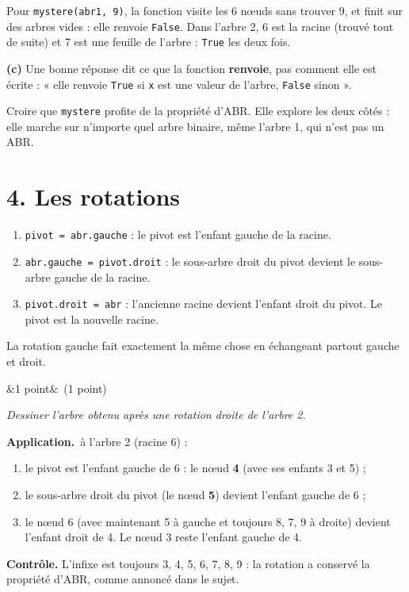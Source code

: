 \documentclass[11pt, a4paper]{exam}
\newcommand{\code}[1]{\texttt{#1}}
\newcommand{\Q}[3]{\par\needspace{5\baselineskip}\bigskip\noindent{\large\bfseries Question #1}\ifx&#2&\else\ \textnormal{(#2)}\fi\par\nopagebreak\smallskip\noindent\textit{#3}\par\nopagebreak\smallskip}
\newcommand{\application}{\par\noindent\textbf{Application.}\ }
\begin{document}
Pour \code{mystere(abr1, 9)}, la fonction visite les 6 nœuds sans trouver 9, et finit sur des arbres vides : elle renvoie \code{False}. Dans l'arbre 2, 6 est la racine (trouvé tout de suite) et 7 est une feuille de l'arbre : \code{True} les deux fois.

\textbf{(c)} Une bonne réponse dit ce que la fonction \textbf{renvoie}, pas comment elle est écrite : « elle renvoie \code{True} si \code{x} est une valeur de l'arbre, \code{False} sinon ».
\begin{erreur}
Croire que \code{mystere} profite de la propriété d'ABR. Elle explore les deux côtés : elle marche sur n'importe quel arbre binaire, même l'arbre 1, qui n'est pas un ABR.
\end{erreur}

\section*{4. Les rotations}

\begin{retenir}
\begin{enumerate}
\item \code{pivot = abr.gauche} : le pivot est l'enfant gauche de la racine.
\item \code{abr.gauche = pivot.droit} : le sous-arbre droit du pivot devient le sous-arbre gauche de la racine.
\item \code{pivot.droit = abr} : l'ancienne racine devient l'enfant droit du pivot. Le pivot est la nouvelle racine.
\end{enumerate}
La rotation gauche fait exactement la même chose en échangeant partout gauche et droit.
\end{retenir}

\Q{8}{1 point}{Dessiner l'arbre obtenu après une rotation droite de l'arbre 2.}
\begin{reponse}
\begin{center}
\end{center}
\end{reponse}
\application à l'arbre 2 (racine 6) :
\begin{enumerate}
\item le pivot est l'enfant gauche de 6 : le nœud \textbf{4} (avec ses enfants 3 et 5) ;
\item le sous-arbre droit du pivot (le nœud \textbf{5}) devient l'enfant gauche de 6 ;
\item le nœud 6 (avec maintenant 5 à gauche et toujours 8, 7, 9 à droite) devient l'enfant droit de 4. Le nœud 3 reste l'enfant gauche de 4.
\end{enumerate}
\textbf{Contrôle.} L'infixe est toujours 3, 4, 5, 6, 7, 8, 9 : la rotation a conservé la propriété d'ABR, comme annoncé dans le sujet.
\end{document}

